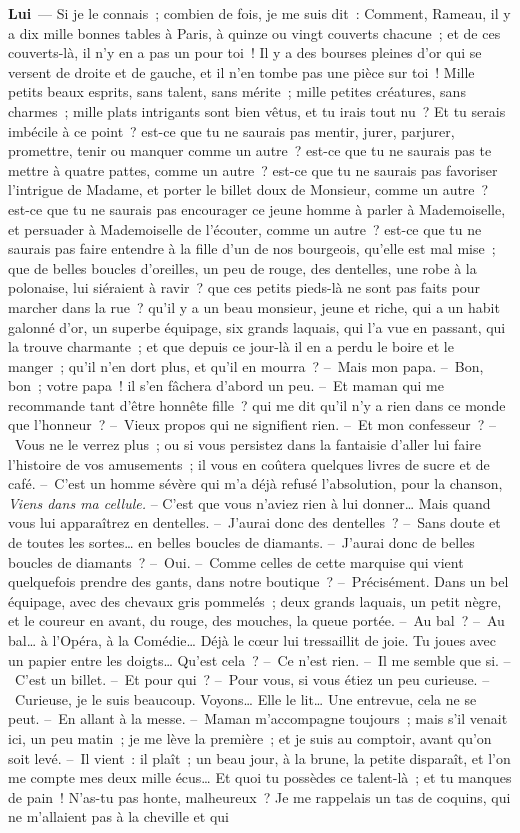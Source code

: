 \documentclass[french,twoside]{book} %
\newcommand{\labelchar}[1]{\textbf{\color{rubric} #1}}
\begin{document}
\labelchar{Lui} — Si je le connais ; combien de fois, je me suis dit : Comment, Rameau, il y a dix mille bonnes tables à Paris, à quinze ou vingt couverts chacune ; et de ces couverts-là, il n’y en a pas un pour toi ! Il y a des bourses pleines d’or qui se versent de droite et de gauche, et il n’en tombe pas une pièce sur toi ! Mille petits beaux esprits, sans talent, sans mérite ; mille petites créatures, sans charmes ; mille plats intrigants sont bien vêtus, et tu irais tout nu ? Et tu serais imbécile à ce point ? est-ce que tu ne saurais pas mentir, jurer, parjurer, promettre, tenir ou manquer comme un autre ? est-ce que tu ne saurais pas te mettre à quatre pattes, comme un autre ? est-ce que tu ne saurais pas favoriser l’intrigue de Madame, et porter le billet doux de Monsieur, comme un autre ? est-ce que tu ne saurais pas encourager ce jeune homme à parler à Mademoiselle, et persuader à Mademoiselle de l’écouter, comme un autre ? est-ce que tu ne saurais pas faire entendre à la fille d’un de nos bourgeois, qu’elle est mal mise ; que de belles boucles d’oreilles, un peu de rouge, des dentelles, une robe à la polonaise, lui siéraient à ravir ? que ces petits pieds-là ne sont pas faits pour marcher dans la rue ? qu’il y a un beau monsieur, jeune et riche, qui a un habit galonné d’or, un superbe équipage, six grands laquais, qui l’a vue en passant, qui la trouve charmante ; et que depuis ce jour-là il en a perdu le boire et le manger ; qu’il n’en dort plus, et qu’il en mourra ? – Mais mon papa. – Bon, bon ; votre papa ! il s’en fâchera d’abord un peu. – Et maman qui me recommande tant d’être honnête fille ? qui me dit qu’il n’y a rien dans ce monde que l’honneur ? – Vieux propos qui ne signifient rien. – Et mon confesseur ? – Vous ne le verrez plus ; ou si vous persistez dans la fantaisie d’aller lui faire l’histoire de vos amusements ; il vous en coûtera quelques livres de sucre et de café. – C’est un homme sévère qui m’a déjà refusé l’absolution, pour la chanson, \emph{Viens dans ma cellule.} – C’est que vous n’aviez rien à lui donner… Mais quand vous lui apparaîtrez en dentelles. – J’aurai donc des dentelles ? – Sans doute et de toutes les sortes… en belles boucles de diamants. – J’aurai donc de belles boucles de diamants ? – Oui. – Comme celles de cette marquise qui vient quelquefois prendre des gants, dans notre boutique ? – Précisément. Dans un bel équipage, avec des chevaux gris pommelés ; deux grands laquais, un petit nègre, et le coureur en avant, du rouge, des mouches, la queue portée. – Au bal ? – Au bal… à l’Opéra, à la Comédie… Déjà le cœur lui tressaillit de joie. Tu joues avec un papier entre les doigts… Qu’est cela ? – Ce n’est rien. – Il me semble que si. – C’est un billet. – Et pour qui ? – Pour vous, si vous étiez un peu curieuse. – Curieuse, je le suis beaucoup. Voyons… Elle le lit… Une entrevue, cela ne se peut. – En allant à la messe. – Maman m’accompagne toujours ; mais s’il venait ici, un peu matin ; je me lève la première ; et je suis au comptoir, avant qu’on soit levé. – Il vient : il plaît ; un beau jour, à la brune, la petite disparaît, et l’on me compte mes deux mille écus… Et quoi tu possèdes ce talent-là ; et tu manques de pain ! N’as-tu pas honte, malheureux ? Je me rappelais un tas de coquins, qui ne m’allaient pas à la cheville et qui 
\end{document}
